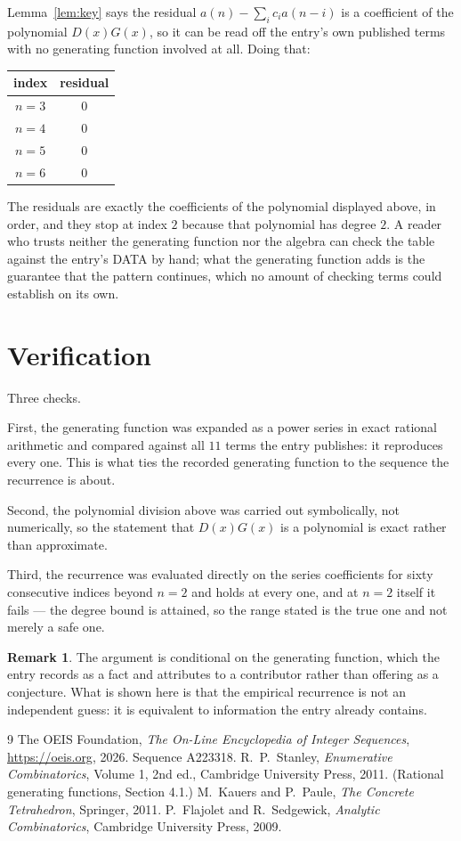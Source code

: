\documentclass[11pt,a4paper]{article}
\theoremstyle{plain}
\theoremstyle{definition}
\newtheorem{remark}[theorem]{Remark}
\begin{document}
Lemma~\ref{lem:key} says the residual $a(n)-\sum_ic_ia(n-i)$ is a coefficient of the
polynomial $D(x)G(x)$, so it can be read off the entry's own published terms with no
generating function involved at all. Doing that:
\begin{center}
\begin{tabular}{cc}
index & residual \\ \hline
$n=3$ & $0$ \\
$n=4$ & $0$ \\
$n=5$ & $0$ \\
$n=6$ & $0$
\end{tabular}
\end{center}
The residuals are exactly the coefficients of the polynomial displayed above, in order, and
they stop at index $2$ because that polynomial has degree $2$. A reader who trusts
neither the generating function nor the algebra can check the table against the entry's DATA
by hand; what the generating function adds is the guarantee that the pattern continues, which
no amount of checking terms could establish on its own.

\section{Verification}

Three checks.

First, the generating function was expanded as a power series in exact rational arithmetic and
compared against all $11$ terms the entry publishes: it reproduces every one. This is
what ties the recorded generating function to the sequence the recurrence is about.

Second, the polynomial division above was carried out symbolically, not numerically, so the
statement that $D(x)G(x)$ is a polynomial is exact rather than approximate.

Third, the recurrence was evaluated directly on the series coefficients for sixty consecutive
indices beyond $n=2$ and holds at every one, and at $n=2$ itself it fails --- the
degree bound is attained, so the range stated is the true one and not merely a safe one.

\begin{remark}
The argument is conditional on the generating function, which the entry records as a fact and
attributes to a contributor rather than offering as a conjecture. What is shown here is that
the empirical recurrence is not an independent guess: it is equivalent to information the
entry already contains.
\end{remark}

\begin{thebibliography}{9}
 The OEIS Foundation, \emph{The On-Line Encyclopedia of Integer
Sequences}, \url{https://oeis.org}, 2026. Sequence A223318.
 R.~P.~Stanley, \emph{Enumerative Combinatorics}, Volume 1, 2nd ed.,
Cambridge University Press, 2011. (Rational generating functions, Section 4.1.)
 M.~Kauers and P.~Paule, \emph{The Concrete Tetrahedron}, Springer, 2011.
 P.~Flajolet and R.~Sedgewick, \emph{Analytic Combinatorics}, Cambridge
University Press, 2009.
\end{thebibliography}
\end{document}
